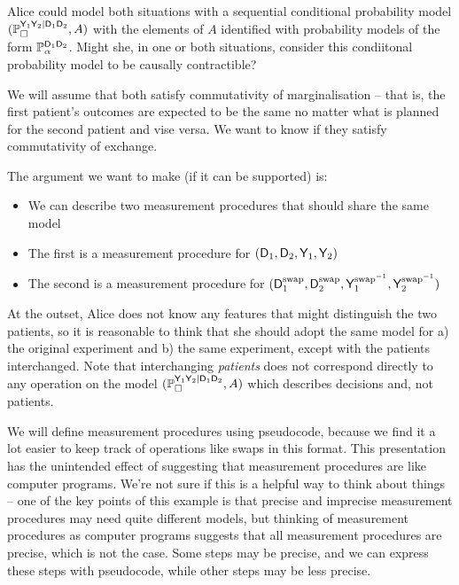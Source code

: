 Alice could model both situations with a sequential conditional probability model $(\mathbb{P}_\square^{\mathsf{Y}_1\mathsf{Y}_2|\mathsf{D}_1\mathsf{D}_2},A)$ with the elements of $A$ identified with probability models of the form $\mathbb{P}_\alpha^{\mathsf{D}_1\mathsf{D}_2}$. Might she, in one or both situations, consider this condiitonal probability model to be causally contractible?

We will assume that both satisfy commutativity of marginalisation -- that is, the first patient's outcomes are expected to be the same no matter what is planned for the second patient and vise versa. We want to know if they satisfy commutativity of exchange.

The argument we want to make (if it can be supported) is:
\begin{itemize}
    \item We can describe two measurement procedures that should share the same model
    \item The first is a measurement procedure for $(\mathsf{D}_1,\mathsf{D}_2,\mathsf{Y}_1,\mathsf{Y}_2)$
    \item The second is a measurement procedure for $(\mathsf{D}^{\text{swap}}_1,\mathsf{D}^{\text{swap}}_2,\mathsf{Y}^{\text{swap}^{-1}}_1,\mathsf{Y}^{\text{swap}^{-1}}_2)$
\end{itemize}

At the outset, Alice does not know any features that might distinguish the two patients, so it is reasonable to think that she should adopt the same model for a) the original experiment and b) the same experiment, except with the patients interchanged. Note that interchanging \emph{patients} does not correspond directly to any operation on the model $(\mathbb{P}_\square^{\mathsf{Y}_1\mathsf{Y}_2|\mathsf{D}_1\mathsf{D}_2},A)$ which describes decisions and, not patients.

We will define measurement procedures using pseudocode, because we find it a lot easier to keep track of operations like swaps in this format. This presentation has the unintended effect of suggesting that measurement procedures are like computer programs. We're not sure if this is a helpful way to think about things -- one of the key points of this example is that precise and imprecise measurement procedures may need quite different models, but thinking of measurement procedures as computer programs suggests that all measurement procedures are precise, which is not the case. Some steps may be precise, and we can express these steps with pseudocode, while other steps may be less precise. 

